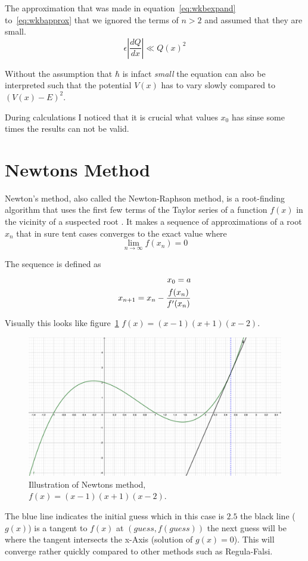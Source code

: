 \documentclass[11pt,DIV=10,final]{scrreprt} %
\begin{document}
The approximation that was made in equation~\ref{eq:wkbexpand} to~\ref{eq:wkbapprox} that we ignored the terms of $n > 2$ and assumed that they are small.
\[
\epsilon \left|{\frac {dQ}{dx}}\right|\ll Q(x)^{2}
\]

Without the assumption that $\hbar$ is infact \textit{small} the equation can also be interpreted such that the potential $V(x)$ has to vary slowly compared to $(V(x) - E)^{2}$.

During calculations I noticed that it is crucial what values $x_{0}$ has sinse some times the results can not be valid.

\section{Newtons Method}
Newton's method, also called the Newton-Raphson method, is a root-finding algorithm that uses the first few terms of the Taylor series of a function $f(x)$ in the vicinity of a suspected root
\citep{math:newton}. It makes a sequence of approximations of a root $x_{n}$ that in sure tent cases converges to the exact value where
\[
  \lim _{n \to \infty}f(x_{n}) = 0
\]

The sequence is defined as
\begin{align*}
  x_{0}=a \\*
  x_{n+1}=x_{n}-{f(x_{n}) \over f'(x_{n})}
\end{align*}

Visually this looks like figure~\ref{fig:newton-ilust} $f(x) = (x-1)(x+1)(x-2)$.
\begin{figure}
	\includegraphics[width=\textwidth]{newtons-method.pdf}
	\caption{Illustration of Newtons method, $f(x) = (x-1)(x+1)(x-2)$.}
	\label{fig:newton-ilust}
\end{figure}
The blue line indicates the initial guess which in this case is $2.5$ the black line ($g(x)$) is a tangent to $f(x)$ at $(guess, f(guess))$ the next guess will be where
the tangent intersects the x-Axis (solution of $g(x) = 0$). This will converge rather quickly compared to other methods such as Regula-Falsi.
\end{document}
